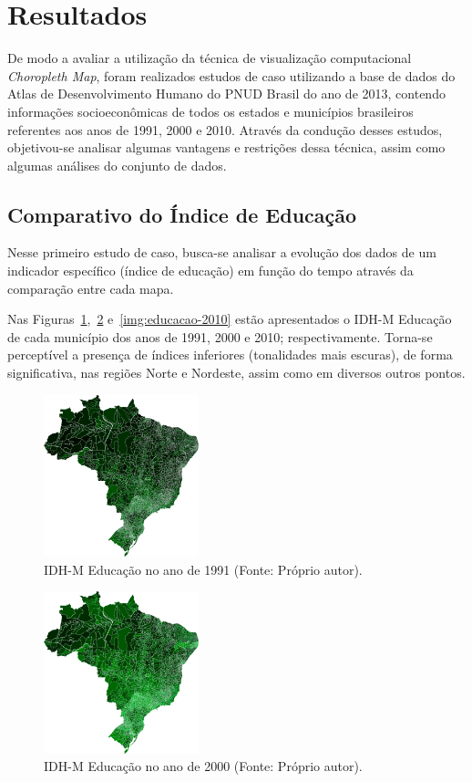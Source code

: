 \documentclass[conference]{IEEEtran}
\begin{document}
\section{Resultados}
\label{section:resultados}

De modo a avaliar a utilização da técnica de visualização computacional \textit{Choropleth Map}, foram realizados estudos de caso utilizando a base de dados do Atlas de Desenvolvimento Humano do PNUD Brasil do ano de 2013, contendo informações socioeconômicas de todos os estados e municípios brasileiros referentes aos anos de 1991, 2000 e 2010. Através da condução desses estudos, objetivou-se analisar algumas vantagens e restrições dessa técnica, assim como algumas análises do conjunto de dados.

\subsection{Comparativo do Índice de Educação}

Nesse primeiro estudo de caso, busca-se analisar a evolução dos dados de um indicador específico (índice de educação) em função do tempo através da comparação entre cada mapa.

Nas Figuras~\ref{img:educacao-1991},~\ref{img:educacao-2000} e~\ref{img:educacao-2010} estão apresentados o IDH-M Educação de cada município dos anos de 1991, 2000 e 2010; respectivamente. Torna-se perceptível a presença de índices inferiores (tonalidades mais escuras), de forma significativa, nas regiões Norte e Nordeste, assim como em diversos outros pontos. 

\begin{figure}[!ht]
\centering
\includegraphics[width=0.40\textwidth]{educacao-1991.png}
\caption{IDH-M Educação no ano de 1991 (Fonte: Próprio autor).}
\label{img:educacao-1991}
\end{figure}

\begin{figure}[!ht]
\centering
\includegraphics[width=0.40\textwidth]{educacao-2000.png}
\caption{IDH-M Educação no ano de 2000 (Fonte: Próprio autor).}
\label{img:educacao-2000}
\end{figure}
\end{document}
